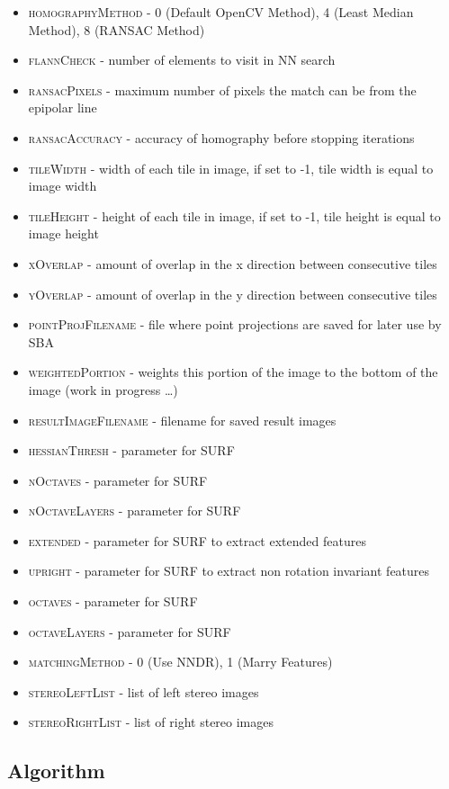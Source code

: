\begin{itemize}
	\item{\textsc{homographyMethod}} - 0 (Default OpenCV Method), 4 (Least Median Method), 8 (RANSAC Method)
	\item{\textsc{flannCheck}} - number of elements to visit in NN search
	\item{\textsc{ransacPixels}} - maximum number of pixels the match can be from the epipolar line
	\item{\textsc{ransacAccuracy}} - accuracy of homography before stopping iterations
	\item{\textsc{tileWidth}} - width of each tile in image, if set to -1, tile width is equal to image width
	\item{\textsc{tileHeight}} - height of each tile in image, if set to -1, tile height is equal to image height
	\item{\textsc{xOverlap}} - amount of overlap in the x direction between consecutive tiles
	\item{\textsc{yOverlap}} - amount of overlap in the y direction between consecutive tiles
	\item{\textsc{pointProjFilename}} - file where point projections are saved for later use by SBA
	\item{\textsc{weightedPortion}} - weights this portion of the image to the bottom of the image (work in progress \ldots)
	\item{\textsc{resultImageFilename}} - filename for saved result images
	\item{\textsc{hessianThresh}} - parameter for SURF
	\item{\textsc{nOctaves}} - parameter for SURF
	\item{\textsc{nOctaveLayers}} - parameter for SURF
	\item{\textsc{extended}} - parameter for SURF to extract extended features
	\item{\textsc{upright}} - parameter for SURF to extract non rotation invariant features
	\item{\textsc{octaves}} - parameter for SURF
	\item{\textsc{octaveLayers}} - parameter for SURF
	\item{\textsc{matchingMethod}} - 0 (Use NNDR), 1 (Marry Features)
	\item{\textsc{stereoLeftList}} - list of left stereo images
	\item{\textsc{stereoRightList}} - list of right stereo images
\end{itemize}


\subsection{Algorithm}


